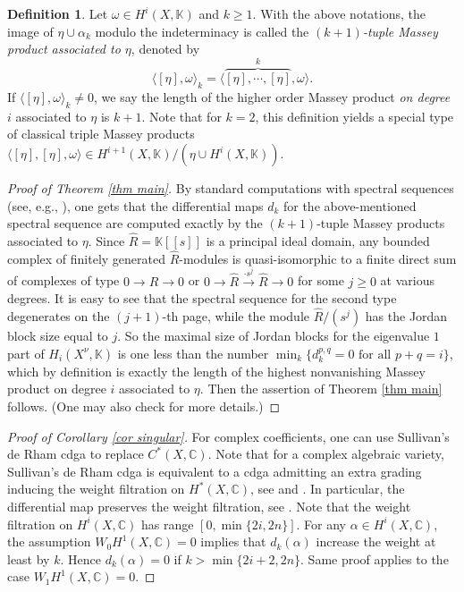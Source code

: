\documentclass[12pt,leqno,twoside]{amsart}
\theoremstyle{plain}
\theoremstyle{definition}
\newtheorem{defn}[theorem]{Definition}
\newcommand{\C}{\mathbb{C}}
\newcommand{\K}{\mathbb{K}}
\begin{document}
\begin{defn}\label{higherM}  Let $\omega\in H^i(X,\K)$ and $k\geq 1$. With the above notations, the image of $\eta \cup \alpha_k$  modulo the indeterminacy is called 
    the {\it $(k+1)$-tuple Massey product associated to $\eta$}, denoted by 
    $$\langle [\eta], \omega\rangle_k=\langle \overbrace{ [\eta],\cdots,[\eta]}^k, \omega \rangle .$$
    If $\langle [\eta], \omega\rangle_k\neq 0$, we say the length of the higher order Massey product {\it on degree $i$ } associated to $\eta$ is  $k+1$.  Note that for $k=2$, this definition yields a special type of classical triple Massey products $ \langle[\eta], [\eta],\omega\rangle \in H^{i+1}(X,\K)/(\eta \cup H^{i}(X,\K))$.
\end{defn} 
\begin{proof}[Proof of Theorem \ref{thm main}]
    By standard computations with spectral sequences (see, e.g., \cite[pages 163--165]{BT}), one gets that
the differential maps $d_k$ for the above-mentioned spectral sequence are computed  exactly by the $(k+1)$-tuple Massey products associated to $\eta$.  
Since $\widehat{R}= \K[[s]]$ is a principal ideal domain, any bounded complex of  finitely generated $\widehat{R}$-modules is quasi-isomorphic to a finite direct sum of complexes of type $0\to \widehat{R}\to 0$ or $0\to \widehat{R}\overset{\cdot s^j}{\to} \widehat{R}  \to 0$ for some $j\geq 0$ at various degrees. It is easy to see that the spectral sequence for the second type degenerates on the $(j+1)$-th page, while the module $ \widehat{R}/(s^j)$ has the Jordan block size equal to $j$. 
So the maximal size of Jordan blocks for the eigenvalue $1$ part of $H_i(X^\nu,\K)$ is one less than the number $\min_k \{d_k^{p,q}=0 \text{ for all } p+q=i\}$, which by definition is exactly the  length of the highest nonvanishing  Massey product  on degree $i$ associated to  $\eta$.  
Then the assertion of Theorem \ref{thm main} follows. (One may also check \cite[Proposition 9.1]{PS10} for more details.)
\end{proof}


\begin{proof}[Proof of Corollary \ref{cor singular}]
For complex coefficients, one can use Sullivan's de Rham cdga to replace $C^*(X,\C)$. Note that for {a} complex algebraic variety,  Sullivan's de Rham cdga is equivalent to a cdga admitting an extra grading inducing the weight filtration on $H^*(X,\C)$, see \cite[Theorem 4.2]{BR} and \cite[Theorem 8.11, Remark 8.12]{CH20}. In particular, the differential map  preserves the weight filtration, see \cite[Theorem 4.2(ii)]{BR}. 
Note that the weight filtration on $H^i(X,\C)$ has range $[0,\min\{2i,2n\}]$. For any $\alpha \in H^i(X,\C)$,  
   the assumption $W_0 H^1(X,\C)=0$ implies that $d_k(\alpha)$ increase the weight at least by $k$. 
    Hence $d_k(\alpha)=0$ if $k> \min\{2i+2,2n\}$. 
Same proof applies to the case $W_1 H^1(X,\C)=0$.
\end{proof}
\end{document}
